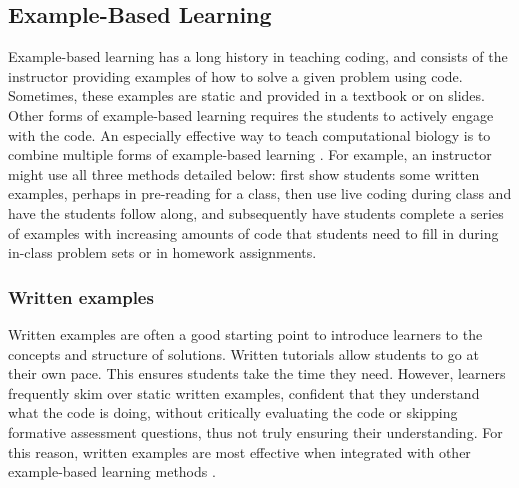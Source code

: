 \subsection{Example-Based Learning}

Example-based learning has a long history in teaching coding, and consists of the instructor providing examples of how to solve a given problem using code.
Sometimes, these examples are static and provided in a textbook or on slides. 
Other forms of example-based learning requires the students to actively engage with the code. 
An especially effective way to teach computational biology is to combine multiple forms of example-based learning \cite{renkl_learning_2014}.
For example, an instructor might use all three methods detailed below:
first show students some written examples, perhaps in pre-reading for a class, then use live coding during class and have the students follow along, and subsequently have students complete a series of examples with increasing amounts of code that students need to fill in during in-class problem sets or in homework assignments.



\subsubsection{Written examples}

Written examples are often a good starting point to introduce learners to the concepts and structure of solutions.
Written tutorials allow students to go at their own pace.
This ensures students take the time they need.
However, learners frequently skim over static written examples, confident that they understand what the code is doing, without critically evaluating the code or skipping formative assessment questions, thus not truly ensuring their understanding.
For this reason, written examples are most effective when integrated with other example-based learning methods \cite{renkl_learning_2014}.


